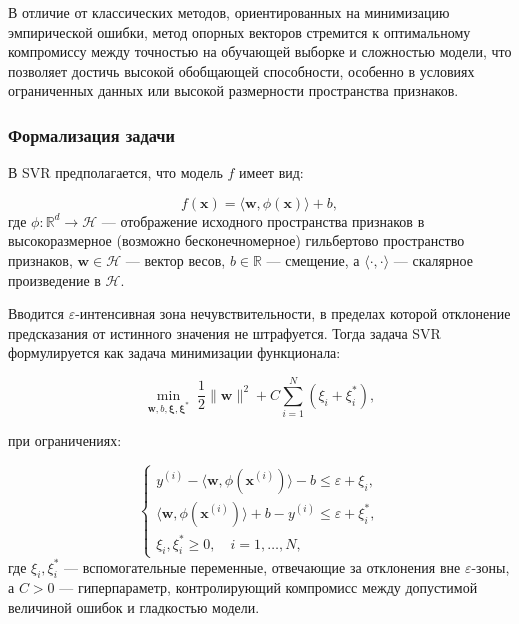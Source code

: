 В отличие от классических методов, ориентированных на минимизацию эмпирической ошибки, метод опорных векторов стремится к оптимальному компромиссу между точностью на обучающей выборке и сложностью модели, что позволяет достичь высокой обобщающей способности, особенно в условиях ограниченных данных или высокой размерности  пространства признаков.

\subsubsection{Формализация задачи}

В SVR предполагается, что модель $f$ имеет вид:

\begin{equation}
f(\mathbf{x}) = \langle \mathbf{w}, \phi(\mathbf{x}) \rangle + b,
\end{equation}
где $\phi: \mathbb{R}^d \to \mathcal{H}$ --- отображение исходного пространства признаков в высокоразмерное (возможно бесконечномерное) гильбертово пространство признаков, $\mathbf{w} \in \mathcal{H}$ --- вектор весов, $b \in \mathbb{R}$ — смещение, а $\langle \cdot, \cdot \rangle$ --- скалярное произведение в $\mathcal{H}$.

Вводится $\varepsilon$-интенсивная зона нечувствительности, в пределах которой отклонение предсказания от истинного значения не штрафуется. Тогда задача SVR формулируется как задача минимизации функционала:

\begin{equation}
\min_{\mathbf{w}, b, \boldsymbol{\xi}, \boldsymbol{\xi}^*} \; \frac{1}{2} \|\mathbf{w}\|^2 + C \sum_{i=1}^{N} (\xi_i + \xi_i^*),
\end{equation}

при ограничениях:

\begin{equation}
\begin{cases}
	y^{(i)} - \langle \mathbf{w}, \phi(\mathbf{x}^{(i)}) \rangle - b \leq \varepsilon + \xi_i, \\
	\langle \mathbf{w}, \phi(\mathbf{x}^{(i)}) \rangle + b - y^{(i)} \leq \varepsilon + \xi_i^*, \\
	\xi_i, \xi_i^* \geq 0, \quad i = 1, \ldots, N,
\end{cases}
\end{equation}
где $\xi_i, \xi_i^*$ --- вспомогательные переменные, отвечающие за отклонения вне $\varepsilon$-зоны, а $C > 0$ --- гиперпараметр, контролирующий компромисс между допустимой величиной ошибок и гладкостью модели.


